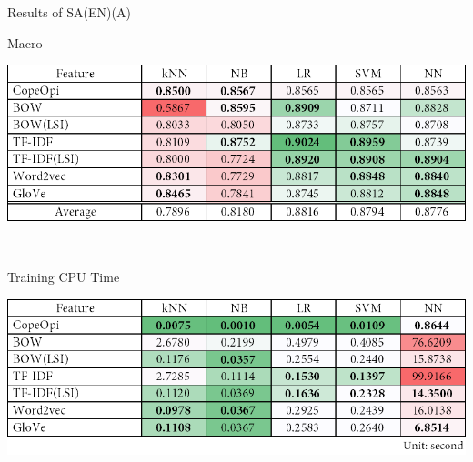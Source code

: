 \begin{table}[H]
\caption{Results of SA(EN)(A)}
\label{tab:sa_en_a}
\centering
\begin{subtable}{\textwidth}
	\centering
	\caption{Macro \fscore{}}
	\includegraphics[width=\resultfigwidth]{chapters/ch4/table/sa/SA(EN)(A).png}
\end{subtable}
\\[\tblskip]
\begin{subtable}{\textwidth}
	\centering
	\caption{Training CPU Time}
	\includegraphics[width=\resultfigwidth]{chapters/ch4/table/sa/SA(EN)(A)T.png}
\end{subtable}
\end{table}